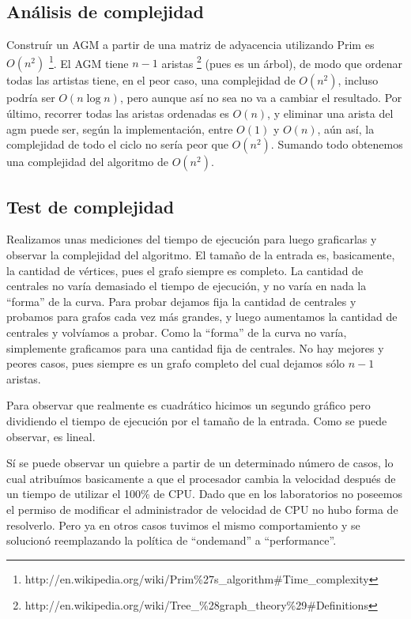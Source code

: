 \subsection{An\'alisis de complejidad}
Construír un AGM a partir de una matriz de adyacencia utilizando Prim es $O(n^2)$ \footnote{http://en.wikipedia.org/wiki/Prim\%27s\_algorithm\#Time\_complexity}.
El AGM tiene $n-1$ aristas \footnote{http://en.wikipedia.org/wiki/Tree\_\%28graph\_theory\%29\#Definitions} (pues es un árbol), de modo que ordenar
todas las artistas tiene, en el peor caso, una complejidad de $O(n^2)$, incluso podría ser $O(n \log n)$, pero aunque así no sea no va a cambiar el resultado.
Por último, recorrer todas las aristas ordenadas es $O(n)$, y eliminar una arista del agm puede ser, según la implementación, entre $O(1)$ y $O(n)$, aún así, la complejidad de todo el ciclo no sería peor que $O(n^2)$. Sumando todo obtenemos una complejidad del algoritmo de $O(n^2)$.

\subsection{Test de complejidad}
Realizamos unas mediciones del tiempo de ejecución para luego graficarlas y observar la complejidad del algoritmo. El tamaño de la entrada es, basicamente,
la cantidad de vértices, pues el grafo siempre es completo. La cantidad de centrales no varía demasiado el tiempo de ejecución, y no varía en nada la ``forma''
de la curva. Para probar dejamos fija la cantidad de centrales y probamos para grafos cada vez más grandes, y luego aumentamos la cantidad de centrales y volvíamos a probar. Como la ``forma'' de la curva no varía, simplemente graficamos para una cantidad fija de centrales. No hay mejores y peores casos, pues siempre es un grafo completo del cual dejamos sólo $n-1$ aristas.

Para observar que realmente es cuadrático hicimos un segundo gráfico pero dividiendo el tiempo
de ejecución por el tamaño de la entrada. Como se puede observar, es lineal.

Sí se puede observar un quiebre a partir de un determinado número de casos, lo cual atribuímos basicamente a que el procesador cambia la velocidad después de
un tiempo de utilizar el 100\% de CPU. Dado que en los laboratorios no poseemos el permiso de modificar el administrador de velocidad de CPU no hubo forma
de resolverlo. Pero ya en otros casos tuvimos el mismo comportamiento y se solucionó reemplazando la política de ``ondemand'' a ``performance''.

